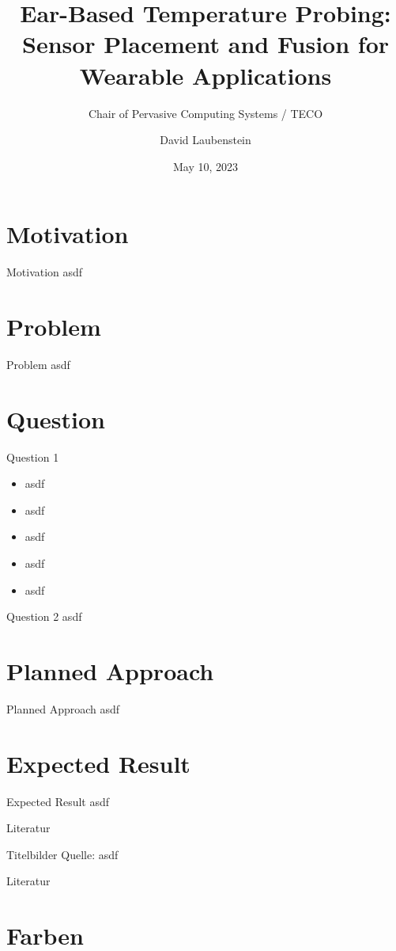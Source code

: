 \documentclass[en]{sdqbeamer}
\title[Ear-Based Temperature Probing]{Ear-Based Temperature Probing: \\ Sensor Placement and Fusion for Wearable Applications}
\subtitle{Chair of Pervasive Computing Systems / TECO}
\author[David Laubenstein]{David Laubenstein}
\date[05/10/2023]{May 10, 2023}
\begin{document}
 
\KITtitleframe


\section{Motivation}
\begin{frame}{Motivation}
asdf
\end{frame}

\section{Problem}
\begin{frame}{Problem}
asdf
\end{frame}

\section{Question}
\begin{frame}{Question 1}
    \begin{itemize}
        \item asdf
        \item asdf
        \item asdf
        \item asdf
        \item asdf
    \end{itemize}
\end{frame}

\begin{frame}{Question 2}
asdf
\end{frame}

\section{Planned Approach}
\begin{frame}{Planned Approach}
asdf
\end{frame}

\section{Expected Result}
\begin{frame}{Expected Result}
asdf
\end{frame}

\appendix
\beginbackup


\begin{frame}{Literatur}
\begin{exampleblock}{Titelbilder Quelle:}
    asdf    
\end{exampleblock}
\end{frame}

\begin{frame}{Literatur}
    \printbibliography
\end{frame}

\section{Farben}
\backupend
\end{document}
